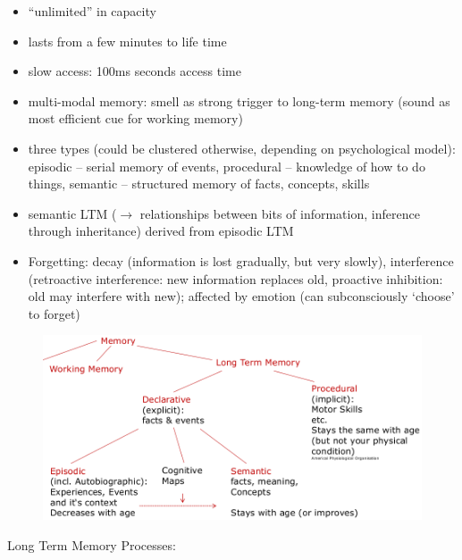 \begin{itemize}
\item ``unlimited'' in capacity
\item lasts from a few minutes to life time
\item slow access: 100ms seconds access time
\item multi-modal memory: smell as strong trigger to long-term memory (sound as most efficient cue for working memory)
\item three types (could be clustered otherwise, depending on psychological model): episodic – serial memory of events, procedural – knowledge of how to do things, semantic – structured memory of facts, concepts, skills
\item semantic LTM ($\rightarrow$ relationships between bits of information, inference through inheritance) derived from episodic LTM
\item Forgetting: decay (information is lost gradually, but very slowly), interference (retroactive interference: new information replaces old, proactive inhibition: old may interfere with new);  affected by emotion (can subconsciously `choose' to forget)
\end{itemize}
\begin{figure}[h!]
	\centering
	\includegraphics[width=.5\textwidth]{img/ch03_mem.png}
	\caption{}
	\label{Memory Model}
\end{figure} 
Long Term Memory Processes:

